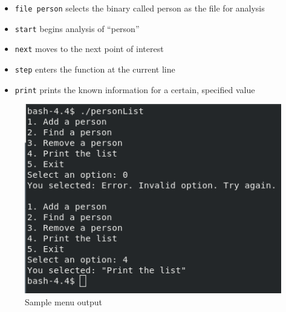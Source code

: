 \begin{itemize}

  \item \texttt{file person} selects the binary called person as the file for analysis

  \item \texttt{start} begins analysis of ``person''

  \item \texttt{next} moves to the next point of interest

  \item \texttt{step} enters the function at the current line

  \item \texttt{print} prints the known information for a certain, specified value

\end{itemize}



\begin{figure}[H]
  \centering
  \includegraphics[width=.9\textwidth]{Figures/output.png}
  \caption{Sample menu output}
  \label{fig:2}
\end{figure}



